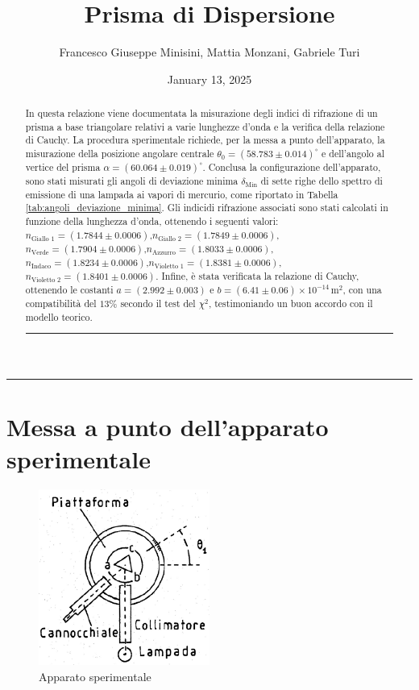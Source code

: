 \documentclass[a4paper,12pt]{article}
\title{Prisma di Dispersione}
\author{Francesco Giuseppe Minisini, Mattia Monzani, Gabriele Turi}
\date{January 13, 2025}
\begin{document}
\maketitle
\hrule
\vspace{9pt}
\begin{abstract}
\noindent
In questa relazione viene documentata la misurazione degli indici di rifrazione di un prisma a base triangolare relativi a varie lunghezze d'onda e la verifica della relazione di Cauchy. La procedura sperimentale richiede, per la messa a punto dell'apparato, la misurazione della posizione angolare centrale \(\theta_0 = (58.783 \pm 0.014)^\circ\) e dell'angolo al vertice del prisma \(\alpha = (60.064 \pm 0.019)^\circ\). Conclusa la configurazione dell'apparato, sono stati misurati gli angoli di deviazione minima \(\delta_{\text{Min}}\) di sette righe dello spettro di emissione di una lampada ai vapori di mercurio, come riportato in Tabella \ref{tab:angoli_deviazione_minima}. Gli indicidi rifrazione associati sono stati calcolati in funzione della lunghezza d'onda, ottenendo i seguenti valori: \(n_{\text{Giallo 1}} = (1.7844 \pm 0.0006)\),\(n_{\text{Giallo 2}} = (1.7849 \pm 0.0006)\),\(n_{\text{Verde}} = (1.7904 \pm 0.0006)\),\(n_{\text{Azzurro}} = (1.8033 \pm 0.0006)\),\(n_{\text{Indaco}} = (1.8234 \pm 0.0006)\),\(n_{\text{Violetto 1}} = (1.8381 \pm 0.0006)\),\(n_{\text{Violetto 2}} = (1.8401 \pm 0.0006)\).
Infine, è stata verificata la relazione di Cauchy, ottenendo le costanti \(a = (2.992 \pm 0.003)\) e \(b = (6.41 \pm 0.06) \times 10^{-14} \, \text{m}^2\), con una compatibilità del \(13\%\) secondo il test del \(\chi^2\), testimoniando un buon accordo con il modello teorico.
\vspace{20pt}
\hrule
\end{abstract}
\vspace{2 pt}

\section{Messa a punto dell'apparato sperimentale}

\begin{figure}[H]
    \centering
    \includegraphics[width=0.5\textwidth]{apparato.png}
    \caption{Apparato sperimentale}
    \label{fig:camera_millikan}
\end{figure}
\end{document}
